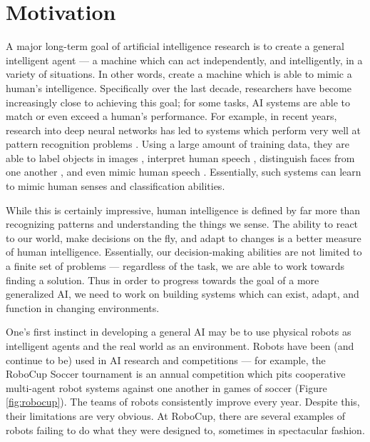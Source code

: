 \section{Motivation} \label{sec:motivation}
A major long-term goal of artificial intelligence research is to create a general intelligent agent --- a machine which can act independently, and intelligently, in a variety of situations.  In other words, create a machine which is able to mimic a human's intelligence.  Specifically over the last decade, researchers have become increasingly close to achieving this goal; for some tasks, AI systems are able to match or even exceed a human's performance.  For example, in recent years, research into deep neural networks has led to systems which perform very well at pattern recognition problems \cite{imagenet}.  Using a large amount of training data, they are able to label objects in images \cite{imagenet}, interpret human speech \cite{HintonDeng}, distinguish faces from one another \cite{parkhi15}, and even mimic human speech \cite{wavenet}.  Essentially, such systems can learn to mimic human senses and classification abilities.

While this is certainly impressive, human intelligence is defined by far more than recognizing patterns and understanding the things we sense.  The ability to react to our world, make decisions on the fly, and adapt to changes is a better measure of human intelligence.  Essentially, our decision-making abilities are not limited to a finite set of problems --- regardless of the task, we are able to work towards finding a solution.  Thus in order to progress towards the goal of a more generalized AI, we need to work on building systems which can exist, adapt, and function in changing environments.

One's first instinct in developing a general AI may be to use physical robots as intelligent agents and the real world as an environment.  Robots have been (and continue to be) used in AI research and competitions --- for example, the RoboCup Soccer \cite{robocup} tournament is an annual competition which pits cooperative multi-agent robot systems against one another in games of soccer (Figure \ref{fig:robocup}).  The teams of robots consistently improve every year.  Despite this, their limitations are very obvious.  At RoboCup, there are several examples of robots failing to do what they were designed to, sometimes in spectacular fashion.


